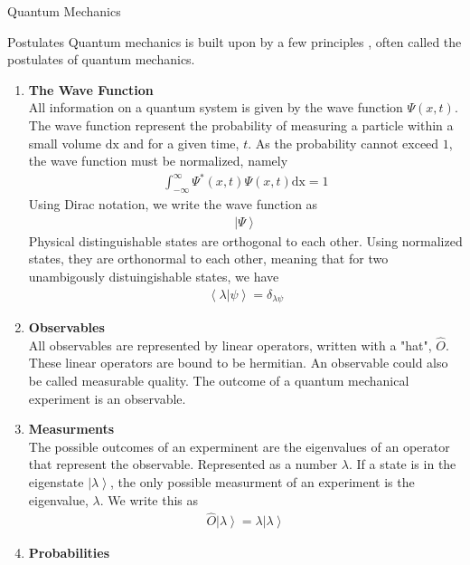 \documentclass[twoside,english]{uiofysmaster}
\begin{document}
\begin{chapter}{Quantum Mechanics}
 	
	\begin{section}{Postulates}
 		Quantum mechanics is built upon by a few principles \cite{Audun,Griffiths,Sakurai,Susskind2014}, often called the postulates of quantum mechanics. 
 		\begin{enumerate}
 			\item \textbf{The Wave Function} \\
 			All information on a quantum system is given by the wave function $\Psi(x,t) $. The wave function represent the probability of measuring a particle within a small volume $\text{dx}$ and for a given time, $t$. As the probability cannot exceed $1$, the wave function must be normalized, namely
 			\begin{align}
 				\int_{-\infty}^\infty \Psi^*(x,t) \Psi(x,t) \text{dx} = 1
 			\end{align}
 			Using Dirac notation, we write the wave function as
 			\begin{align}
 				\left| \Psi \right>
 			\end{align}
 			Physical distinguishable states are orthogonal to each other. Using normalized states, they are orthonormal to each other, meaning that for two unambigously distuingishable states, we have
 			\begin{align}
 				\left< \lambda | \psi \right> = \delta_{\lambda \psi}
 			\end{align}
 			\item \textbf{Observables}\\
			All observables are represented by linear operators, written with a "hat", $\hat O$. These linear operators are bound to be hermitian. An observable could also be called measurable quality. The outcome of a quantum mechanical experiment is an observable. 
			\item \textbf{Measurments}\\
			The possible outcomes of an experminent are the eigenvalues of an operator that represent the observable. Represented as a number $\lambda$. If a state is in the eigenstate $\left| \lambda \right>$, the only possible measurment of an experiment is the eigenvalue, $\lambda$. We write this as
 			\begin{align}
 				\hat O \left| \lambda \right> = \lambda \left| \lambda \right>
 			\end{align}
 			\item \textbf{Probabilities}\\

\end{enumerate}
\end{section}
\end{chapter}
\end{document}
